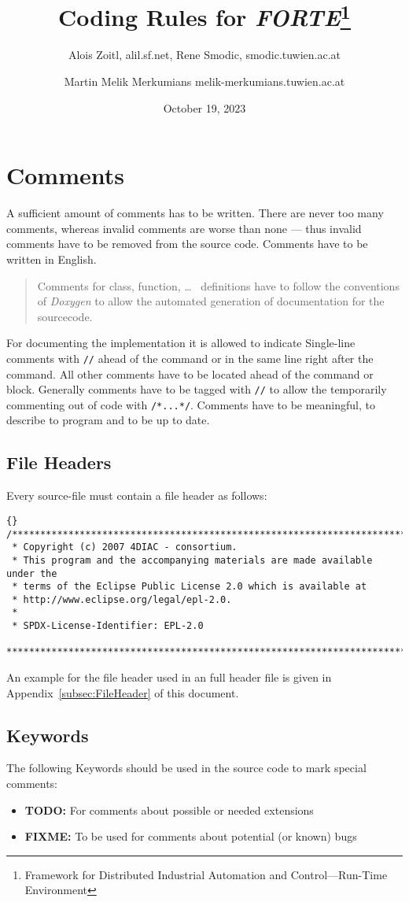 \documentclass[final,a4paper,10pt, oneside]{article}
\title{Coding Rules for \emph{FORTE}\footnote{Framework for Distributed Industrial Automation and Control---Run-Time Environment}}
\author{Alois Zoitl, alil\@@users.sf.net, Rene Smodic, smodic\@@acin.tuwien.ac.at \and Martin Melik Merkumians melik-merkumians\@@acin.tuwien.ac.at}
\date{October 19, 2023}
\begin{document}
\maketitle

\tableofcontents

\section{Comments}
A sufficient amount of comments has to be written. There are never too many comments, whereas invalid comments are worse than none --- thus
invalid comments have to be removed from the source code. Comments have to be written in English. 

\begin{quote}
Comments for class, function, \ldots~ definitions have to follow the conventions of \emph{Doxygen} to allow the automated generation of documentation for the sourcecode. 
\end{quote}

For documenting the implementation it is allowed to indicate Single-line
comments with \verb|//| ahead of the command or in the same line right after the command. All other comments have to be located ahead of the
command or block. Generally comments have to be tagged with \verb|//| to allow the temporarily commenting out of code with \verb|/*...*/|.
Comments have to be meaningful, to describe to program and to be up to date.


\subsection{File Headers}
Every source-file must contain a file header as follows:
\begin{lstlisting}[frame=trbl]{}
/*******************************************************************************
 * Copyright (c) 2007 4DIAC - consortium.
 * This program and the accompanying materials are made available under the
 * terms of the Eclipse Public License 2.0 which is available at
 * http://www.eclipse.org/legal/epl-2.0.
 *
 * SPDX-License-Identifier: EPL-2.0
 *******************************************************************************
\end{lstlisting}
An example for the file header used in an full header file is given in Appendix~\ref{subsec:FileHeader} of this document.

\subsection{Keywords}
The following Keywords should be used in the source code to mark special comments:
\begin{itemize}
	\item \textbf{TODO:} For comments about possible or needed extensions
	\item \textbf{FIXME:} To be used for comments about potential (or known) bugs
\end{itemize}
\end{document}
